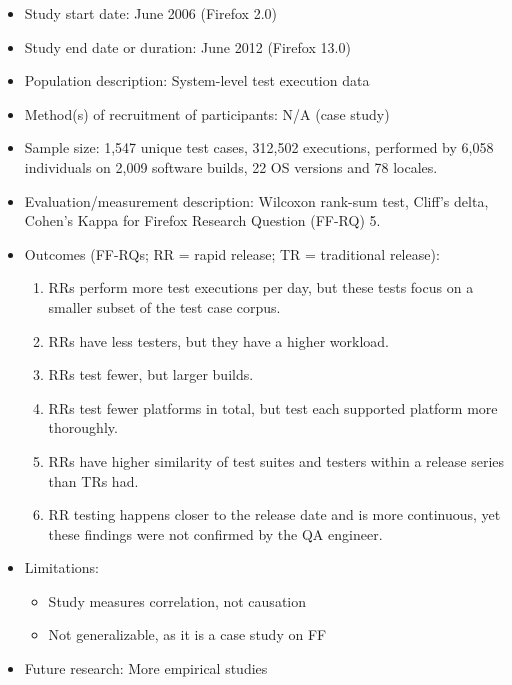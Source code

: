 \documentclass[]{book}
\providecommand{\tightlist}{%
  \setlength{\itemsep}{0pt}\setlength{\parskip}{0pt}}
\begin{document}
\begin{itemize}
\tightlist
\item
  Study start date: June 2006 (Firefox 2.0)
\item
  Study end date or duration: June 2012 (Firefox 13.0)
\item
  Population description: System-level test execution data
\item
  Method(s) of recruitment of participants: N/A (case study)
\item
  Sample size: 1,547 unique test cases, 312,502 executions, performed by
  6,058 individuals on 2,009 software builds, 22 OS versions and 78
  locales.
\item
  Evaluation/measurement description: Wilcoxon rank-sum test, Cliff's
  delta, Cohen's Kappa for Firefox Research Question (FF-RQ) 5.
\item
  Outcomes (FF-RQs; RR = rapid release; TR = traditional release):

  \begin{enumerate}
  \def\labelenumi{\arabic{enumi}.}
  \tightlist
  \item
    RRs perform more test executions per day, but these tests focus on a
    smaller subset of the test case corpus.
  \item
    RRs have less testers, but they have a higher workload.
  \item
    RRs test fewer, but larger builds.
  \item
    RRs test fewer platforms in total, but test each supported platform
    more thoroughly.
  \item
    RRs have higher similarity of test suites and testers within a
    release series than TRs had.
  \item
    RR testing happens closer to the release date and is more
    continuous, yet these findings were not confirmed by the QA
    engineer.
  \end{enumerate}
\item
  Limitations:

  \begin{itemize}
  \tightlist
  \item
    Study measures correlation, not causation
  \item
    Not generalizable, as it is a case study on FF
  \end{itemize}
\item
  Future research: More empirical studies
\end{itemize}
\end{document}
